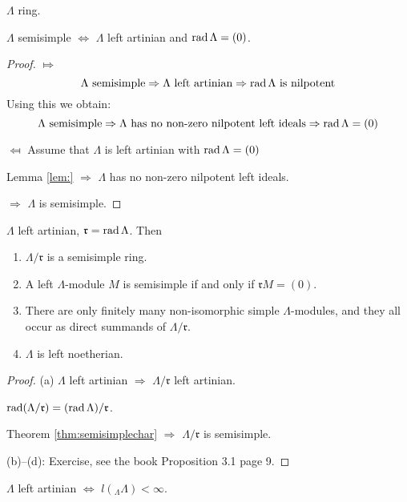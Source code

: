 \begin{thm}\label{thm:semisimplechar}
$\Lambda$ ring.

$\Lambda$ semisimple $\Leftrightarrow$ $\Lambda$ left artinian and
$\operatorname{rad}\nolimits\Lambda = (0)$. 
\end{thm}
\begin{proof}
$\Mapsto$ 
\[\Lambda \textrm{\ semisimple} \Rightarrow \Lambda \textrm{\ left
  artinian}\Rightarrow \operatorname{rad}\nolimits\Lambda \textrm{\ is nilpotent}\]
Using this we obtain:
\[\Lambda \textrm{\ semisimple} \Rightarrow \Lambda \textrm{\ has no non-zero nilpotent left ideals} 
\Rightarrow \rad\Lambda = (0)\]

$\Mapsfrom$ Assume that $\Lambda$ is left artinian with $\operatorname{rad}\nolimits\Lambda =
(0)$

Lemma \ref{lem:} $\Rightarrow$ $\Lambda$ has no non-zero nilpotent
left ideals.

$\Rightarrow$ $\Lambda$ is semisimple.
\end{proof}

\begin{thm}
$\Lambda$ left artinian, $\mathfrak{r} = \operatorname{rad}\nolimits\Lambda$.
Then
\begin{enumerate}[\rm(a)]
\item $\Lambda/\mathfrak{r}$ is a semisimple ring. 
\item A left $\Lambda$-module $M$ is semisimple if and only if
  $\mathfrak{r}M=(0)$. 
\item There are only finitely many non-isomorphic simple
  $\Lambda$-modules, and they all occur as direct summands of
  $\Lambda/\mathfrak{r}$. 
\item $\Lambda$ is left noetherian.
\end{enumerate}
\end{thm}
\begin{proof}
(a) $\Lambda$ left artinian $\Rightarrow$ $\Lambda/\mathfrak{r}$ left
artinian.

$\operatorname{rad}\nolimits(\Lambda/\mathfrak{r}) = (\operatorname{rad}\nolimits\Lambda)/\mathfrak{r}$.

Theorem \ref{thm:semisimplechar} $\Rightarrow$ $\Lambda/\mathfrak{r}$
is semisimple. 

(b)--(d):  Exercise, see the book Proposition 3.1 page 9. 
\end{proof}

\begin{recall}
$\Lambda$ left artinian $\Leftrightarrow$ $l(_\Lambda\Lambda) <
\infty$. 
\end{recall}

